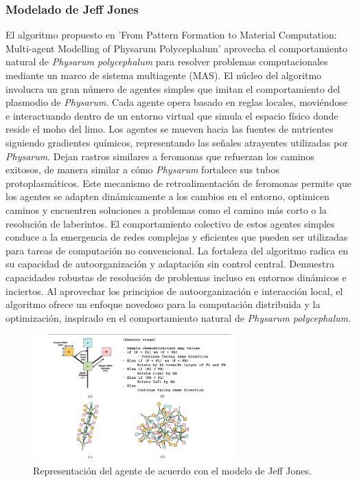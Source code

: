 \subsubsection{Modelado de Jeff Jones} %
\label{ssub:jones}
    El algoritmo propuesto en 'From Pattern Formation to Material Computation: Multi-agent Modelling of Physarum Polycephalum' 
        \cite{Jones2015} aprovecha el comportamiento natural de \textit{Physarum polycephalum} para resolver problemas 
        computacionales mediante un marco de sistema multiagente (MAS). El n\'ucleo del algoritmo involucra un gran n\'umero de 
        agentes simples que imitan el comportamiento del plasmodio de \textit{Physarum}. Cada agente opera basado en reglas 
        locales, movi\'endose e interactuando dentro de un entorno virtual que simula el espacio f\'isico donde reside el moho del limo.
    \vskip 0.5cm
    Los agentes se mueven hacia las fuentes de nutrientes siguiendo gradientes qu\'imicos, representando las se\~nales atrayentes 
        utilizadas por \textit{Physarum}. Dejan rastros similares a feromonas que refuerzan los caminos exitosos, de manera similar 
        a c\'omo \textit{Physarum} fortalece sus tubos protoplasm\'aticos. Este mecanismo de retroalimentaci\'on de feromonas permite 
        que los agentes se adapten din\'amicamente a los cambios en el entorno, optimicen caminos y encuentren soluciones a 
        problemas como el camino m\'as corto o la resoluci\'on de laberintos. El comportamiento colectivo de estos agentes 
        simples conduce a la emergencia de redes complejas y eficientes que pueden ser utilizadas para tareas de computaci\'on no convencional.
    \vskip 0.5cm
    La fortaleza del algoritmo radica en su capacidad de autoorganizaci\'on y adaptaci\'on sin control central. 
        Demuestra capacidades robustas de resoluci\'on de problemas incluso en entornos din\'amicos e inciertos. Al aprovechar 
        los principios de autoorganizaci\'on e interacci\'on local, el algoritmo ofrece un enfoque novedoso para la computaci\'on 
        distribuida y la optimizaci\'on, inspirado en el comportamiento natural de \textit{Physarum polycephalum}.

    \begin{figure}[h]
        \centering
        \includegraphics[width=0.7\textwidth]{./images/estado_del_arte/physarum/pseudoJones.png}
        \caption{Representaci\'on del agente de acuerdo con el modelo de Jeff Jones. \cite{Jones2015}}
        \label{fig:pseudocodigo}
    \end{figure}
